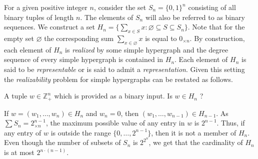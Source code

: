 For a given positive integer $n$, consider the set $S_n = \{0,1\}^n$ consisting of all binary tuples of length $n$. The elements of $S_n$ will also be referred to as binary sequences.
We construct a set $H_n = \{ \sum_{x \in S} x : \varnothing \subseteq S\subseteq S_n\}$. Note that for the empty set $\varnothing$ the corresponding sum $\sum_{x\in\varnothing} x$ is equal to $0_{\times n}$. By construction, each element of $H_n$ is {\em realized} by some simple hypergraph and the degree sequence of every simple hypergraph is contained in $H_n$. Each element of $H_n$ is said to be {\em representable} or is said to admit a {\em representation}.
Given this setting the {\em realizability} problem for simple hypergraphs can be restated as follows.

\problemdef
{\hds}
{A tuple $w \in \mathbb{Z}_+^n$ which is provided as a binary input.}
{Is $w \in H_n$ ?}

If $w=(w_1,\dots,w_n) \in H_n$ and $w_n=0$, then $(w_1,\dots, w_{n-1})\in H_{n-1}$. As $\sum S_n = 2^{n-1}_{\times n}$, the maximum possible value of any entry in $w$ is $2^{n-1}$. Thus, if any entry of $w$ is outside the range $\{0, \ldots, 2^{n-1}\}$, then it is not a member of $H_n$.
Even though the number of subsets of $S_n$ is $2^{2^n}$, we get that the cardinality of $H_n$ is at most $2^{n\cdot (n-1)}$.
